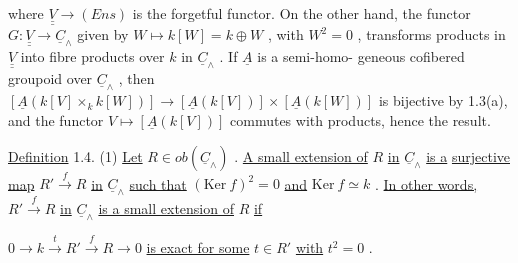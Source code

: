 \begin{center}
\end{center}
where  $\underline{\underline{V}} \to (Ens)$  is the forgetful functor. On the other hand, the functor
$G : \underline{\underline{V}} \longrightarrow \underline{C}_{\wedge}$  given by  $W \longmapsto k[W] = k \oplus W$ , with  $W^{2} = 0$ , transforms
products in  $\underline{\underline{V}}$  into fibre products over  $k$  in  $\underline{C}_{\wedge}$ . If  $\underline{A}$  is a semi-homo-
geneous cofibered groupoid over  $\underline{C}_{\wedge}$ , then  $[\underline{A}(k[V] \times_{k} k[W])] \longrightarrow [\underline{A}(k[V])] \times [\underline{A}(k[W])]$
is bijective by 1.3(a), and the functor  $V \longmapsto [\underline{A}(k[V])]$  commutes with products,
hence the result.

\underline{Definition} 1.4. (1) \underline{Let}  $R \in ob(\underline{C}_{\wedge})$ . \underline{A small extension of}  $R$  \underline{in}  $\underline{C}_{\wedge}$  \underline{is a}
\underline{surjective map}  $R' \xrightarrow{\ f\ } R$  \underline{in}  $\underline{C}_{\wedge}$  \underline{such that}  $(\mathrm{Ker}\ f)^{2} = 0$  \underline{and}  $\mathrm{Ker}\ f \simeq k$ .
\underline{In other words,}  $R' \xrightarrow{\ f\ } R$  \underline{in}  $\underline{C}_{\wedge}$  \underline{is a small extension of}  $R$  \underline{if}

$0 \longrightarrow k \xrightarrow{\ t\ } R' \xrightarrow{\ f\ } R \longrightarrow 0$
\underline{is exact for some}  $t \in R'$  \underline{with}  $t^{2} = 0$ .

